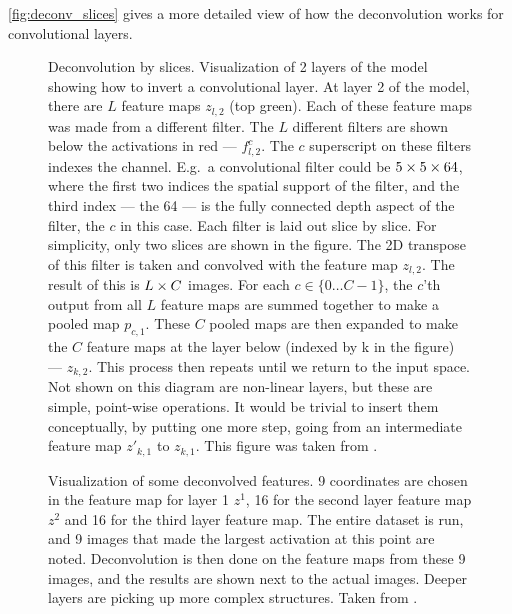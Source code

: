   \autoref{fig:deconv_slices} gives a more detailed view of how the
  deconvolution works for convolutional layers.
  \begin{figure}
    \centering
      \caption[Deconvolution by slices]
              {Deconvolution by slices. 
              Visualization of 2 layers of the model showing how to invert
              a convolutional layer. At layer 2 of the model, there are $L$ feature
              maps $z_{l,2}$ (top green). Each of these feature
              maps was made from a different filter. The $L$ different filters
              are shown below the activations in red --- $f^c_{l,2}$. The
              $c$ superscript on these filters indexes the channel. E.g.\
              a convolutional filter could be $5\times 5\times 64$, where the first two
              indices the spatial support of the filter, and the third index
              --- the 64 --- is the fully connected depth aspect of the filter,
              the $c$ in this case. Each filter is laid out slice by slice. For
              simplicity, only two slices are shown in the figure. The
              2D transpose of this filter is taken and convolved with the
              feature map $z_{l,2}$. The result of this is $L\times C$ images. For
              each $c \in \{0\ldots C-1\}$, the $c$'th output from all $L$
              feature maps are summed together to make a pooled map $p_{c,1}$.
              These $C$ pooled maps are then expanded to make the $C$ feature
              maps at the layer below (indexed by k in the figure) --- $z_{k,2}$. 
              This process then repeats
              until we return to the input space. Not shown on this diagram are
              non-linear layers, but these are simple, point-wise operations.
              It would be trivial to insert them conceptually, by putting one
              more step, going from an intermediate feature map $z'_{k,1}$ to
              $z_{k,1}$. This figure was taken from
              \citep{zeiler_adaptive_2011}.}
      \label{fig:deconv_slices}
  \end{figure}

  \begin{figure}
    \centering
      \caption[Visualization of deconvolved features]
              {Visualization of some deconvolved features.  9 coordinates are chosen in the
              feature map for layer 1 $z^1$, 16 for the second layer
              feature map $z^2$ and 16 for the third layer feature map.
              The entire dataset is run, and 9 images that made the largest
              activation at this point are noted. Deconvolution is then done on
              the feature maps from these 9 images, and the results are shown
              next to the actual images. Deeper layers are picking up more
              complex structures. Taken from \citep{zeiler_visualizing_2014}.}
  \end{figure}

